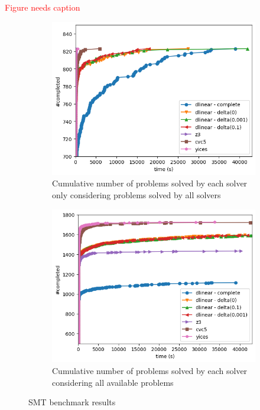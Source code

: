 \documentclass[runningheads]{llncs}
\begin{document}
\textcolor{red}{Figure needs caption}
\begin{figure}[H]
    \centering
    \begin{subfigure}{.46\textwidth}
        \centering
        \includegraphics[width=\linewidth]{img/on_file_smt.png}
        \caption{Cumulative number of problems solved by each solver only considering  problems solved by all solvers}
        \label{fig:results-smt1}
    \end{subfigure}%
    \hspace{1cm}
    \begin{subfigure}{.45\textwidth}
        \centering
        \includegraphics[width=\linewidth]{img/total_smt.png}
        \caption{Cumulative number of problems solved by each solver considering all available problems}
        \label{fig:results-smt2}
    \end{subfigure}
    \caption{SMT benchmark results}
\end{figure}
\end{document}

